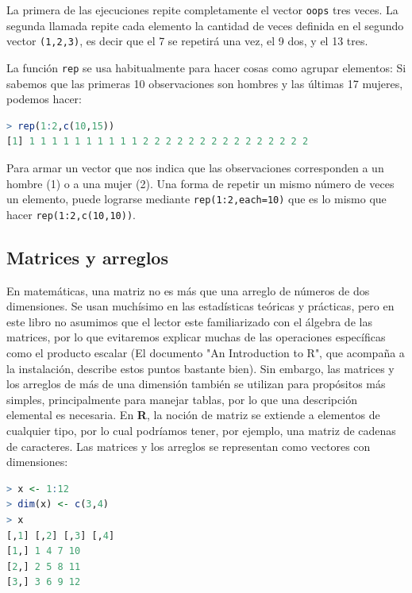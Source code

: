 La primera de las ejecuciones repite completamente el vector \texttt{oops} tres
veces.  La segunda llamada repite cada elemento la cantidad de veces definida
en el segundo vector \texttt{(1,2,3)}, es decir que el 7 se repetirá una vez,
el 9 dos, y el 13 tres.

La función \texttt{rep} se usa habitualmente para hacer cosas como agrupar elementos: Si
sabemos que las primeras 10 observaciones son hombres y las últimas 17 mujeres,
podemos hacer:

\begin{lstlisting}[language=R]
> rep(1:2,c(10,15))
[1] 1 1 1 1 1 1 1 1 1 1 2 2 2 2 2 2 2 2 2 2 2 2 2 2 2
\end{lstlisting}

Para armar un vector que nos indica que las observaciones corresponden a un
hombre (1) o a una mujer (2).  Una forma de repetir un mismo número de veces un
elemento, puede lograrse mediante \texttt{rep(1:2,each=10)} que es lo mismo que
hacer \texttt{rep(1:2,c(10,10))}.

\subsection{Matrices y arreglos}

En matemáticas, una matriz no es más que una arreglo de números de dos
dimensiones. Se usan muchísimo en las estadísticas teóricas y prácticas, pero
en este libro no asumimos que el lector este familiarizado con el álgebra de
las matrices, por lo que evitaremos explicar muchas de las operaciones
específicas como el producto escalar (El documento "An Introduction to R", que
acompaña a la instalación, describe estos puntos bastante bien). Sin embargo,
las matrices y los arreglos de más de una dimensión también se utilizan para
propósitos más simples, principalmente para manejar tablas, por lo que una
descripción elemental es necesaria. En \textbf{R}, la noción de matriz se
extiende a elementos de cualquier tipo, por lo cual podríamos tener, por
ejemplo, una matriz de cadenas de caracteres. Las matrices y los arreglos se
representan como vectores con dimensiones:


\begin{lstlisting}[language=R]
> x <- 1:12
> dim(x) <- c(3,4)
> x
[,1] [,2] [,3] [,4]
[1,] 1 4 7 10
[2,] 2 5 8 11
[3,] 3 6 9 12
\end{lstlisting}

